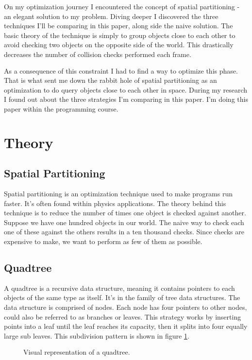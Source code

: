 \documentclass[a4paper, 12pt]{article}
\begin{document}
On my optimization journey I encountered the concept of spatial partitioning -
an elegant solution to my problem. Diving deeper I discovered the three
techniques I'll be comparing in this paper, along side the naive solution. The
basic theory of the technique is simply to group objects close to each other to
avoid checking two objects on the opposite side of the world. This drastically
decreases the number of collision checks performed each frame.

As a consequence of this constraint I had to find a way to optimize this phase.
That is what sent me down the rabbit hole of spatial partitioning as an
optimization to do query objects close to each other in space. During my
research I found out about the three strategies I'm comparing in this paper. I'm
doing this paper within the programming course.

\section{Theory}
\subsection{Spatial Partitioning}
Spatial partitioning is an optimization technique used to make programs run
faster. It's often found within physics applications. The theory behind this
technique is to reduce the number of times one object is checked against
another. Suppose we have one hundred objects in our world. The naive way to
check each one of these against the others results in a ten thousand checks.
Since checks are expensive to make, we want to perform as few of them as
possible.

\subsection{Quadtree}
A quadtree is a recursive data structure, meaning it contains pointers to each
objects of the same type as itself. It's in the family of tree data structures.
The data structure is comprised of nodes. Each node has four pointers to other
nodes, could also be referred to as branches or leaves. This strategy works by
inserting points into a leaf until the leaf reaches its capacity, then it splits
into four equally large sub leaves. This subdivision pattern is shown in figure
\ref{fig:quadtree}.

\begin{figure}[ht]
    
    \caption{Visual representation of a quadtree.}
    \label{fig:quadtree}
\end{figure}
\end{document}
